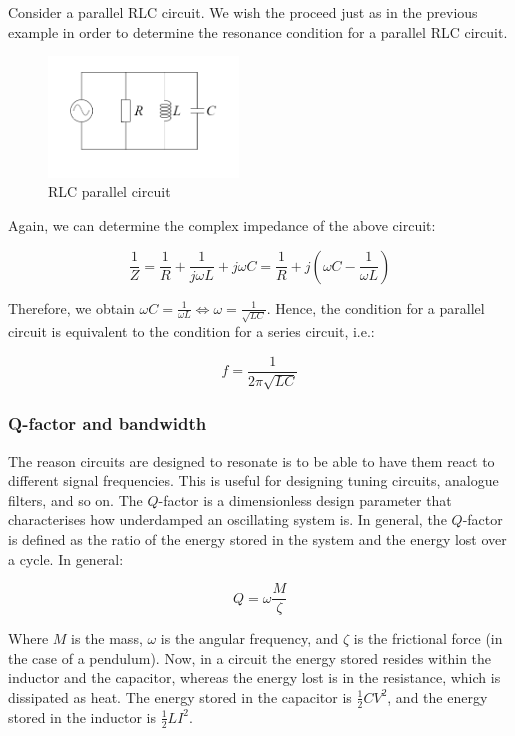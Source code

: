 \documentclass{article}
\begin{document}
\begin{proposition}
    Consider a parallel RLC circuit. We wish the proceed just as in the previous example in order to determine the resonance condition for a parallel RLC circuit.

    \begin{figure}[h]
        \centering
        \includegraphics[width=0.45\textwidth]{images/rlcpar.png}
        \caption{RLC parallel circuit}
        \label{fig:rlc-parallel}
    \end{figure}

    Again, we can determine the complex impedance of the above circuit:

    \[ \frac{1}{Z} = \frac{1}{R} + \frac{1}{j\omega L} + j\omega C = \frac{1}{R} + j(\omega C - \frac{1}{\omega L}) \]

    Therefore, we obtain $\omega C = \frac{1}{\omega L} \iff \omega = \frac{1}{\sqrt{LC}}$. Hence, the condition for a parallel circuit is equivalent to the condition for a series circuit, i.e.:

    \[ f = \frac{1}{2\pi\sqrt{LC}} \]
\end{proposition}

\subsubsection{Q-factor and bandwidth}

The reason circuits are designed to resonate is to be able to have them react to different signal frequencies. This is useful for designing tuning circuits, analogue filters, and so on. The $Q$-factor is a dimensionless design parameter that characterises how underdamped an oscillating system is. In general, the $Q$-factor is defined as the ratio of the energy stored in the system and the energy lost over a cycle. In general:

\[ Q = \omega\frac{M}{\zeta} \]

Where $M$ is the mass, $\omega$ is the angular frequency, and $\zeta$ is the frictional force (in the case of a pendulum). Now, in a circuit the energy stored resides within the inductor and the capacitor, whereas the energy lost is in the resistance, which is dissipated as heat. The energy stored in the capacitor is $\frac{1}{2}CV^2$, and the energy stored in the inductor is $\frac{1}{2}LI^2$.
\end{document}
